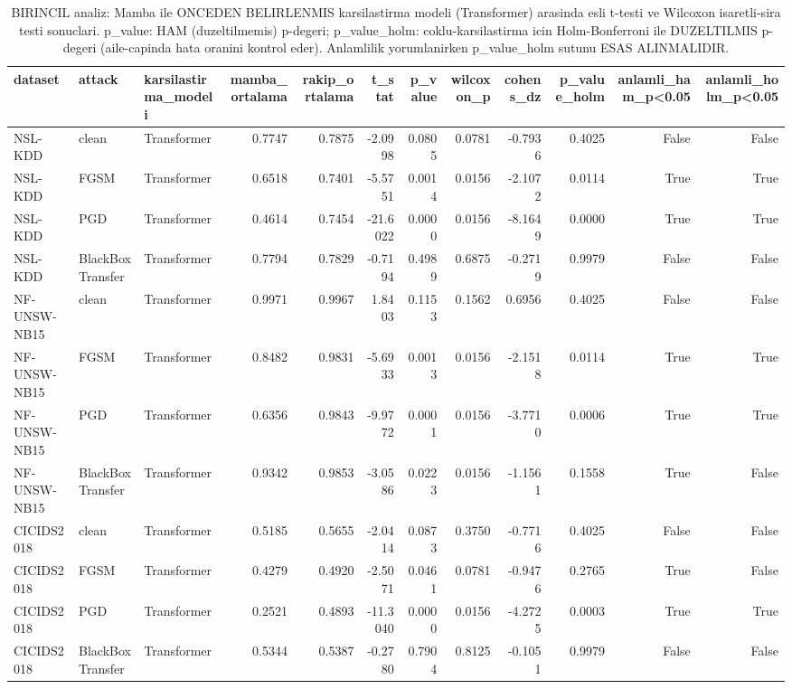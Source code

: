 \begin{table}[ht]
\centering
\caption{BIRINCIL analiz: Mamba ile ONCEDEN BELIRLENMIS karsilastirma modeli (Transformer) arasinda esli t-testi ve Wilcoxon isaretli-sira testi sonuclari. p_value: HAM (duzeltilmemis) p-degeri; p_value_holm: coklu-karsilastirma icin Holm-Bonferroni ile DUZELTILMIS p-degeri (aile-capinda hata oranini kontrol eder). Anlamlilik yorumlanirken p_value_holm sutunu ESAS ALINMALIDIR.}
\label{tab:T2_istatistiksel_anlamlilik}
\begin{tabular}{lllrrrrrrrrr}
\toprule
dataset & attack & karsilastirma\_modeli & mamba\_ortalama & rakip\_ortalama & t\_stat & p\_value & wilcoxon\_p & cohens\_dz & p\_value\_holm & anlamli\_ham\_p<0.05 & anlamli\_holm\_p<0.05 \\
\midrule
NSL-KDD & clean & Transformer & 0.7747 & 0.7875 & -2.0998 & 0.0805 & 0.0781 & -0.7936 & 0.4025 & False & False \\
NSL-KDD & FGSM & Transformer & 0.6518 & 0.7401 & -5.5751 & 0.0014 & 0.0156 & -2.1072 & 0.0114 & True & True \\
NSL-KDD & PGD & Transformer & 0.4614 & 0.7454 & -21.6022 & 0.0000 & 0.0156 & -8.1649 & 0.0000 & True & True \\
NSL-KDD & BlackBoxTransfer & Transformer & 0.7794 & 0.7829 & -0.7194 & 0.4989 & 0.6875 & -0.2719 & 0.9979 & False & False \\
NF-UNSW-NB15 & clean & Transformer & 0.9971 & 0.9967 & 1.8403 & 0.1153 & 0.1562 & 0.6956 & 0.4025 & False & False \\
NF-UNSW-NB15 & FGSM & Transformer & 0.8482 & 0.9831 & -5.6933 & 0.0013 & 0.0156 & -2.1518 & 0.0114 & True & True \\
NF-UNSW-NB15 & PGD & Transformer & 0.6356 & 0.9843 & -9.9772 & 0.0001 & 0.0156 & -3.7710 & 0.0006 & True & True \\
NF-UNSW-NB15 & BlackBoxTransfer & Transformer & 0.9342 & 0.9853 & -3.0586 & 0.0223 & 0.0156 & -1.1561 & 0.1558 & True & False \\
CICIDS2018 & clean & Transformer & 0.5185 & 0.5655 & -2.0414 & 0.0873 & 0.3750 & -0.7716 & 0.4025 & False & False \\
CICIDS2018 & FGSM & Transformer & 0.4279 & 0.4920 & -2.5071 & 0.0461 & 0.0781 & -0.9476 & 0.2765 & True & False \\
CICIDS2018 & PGD & Transformer & 0.2521 & 0.4893 & -11.3040 & 0.0000 & 0.0156 & -4.2725 & 0.0003 & True & True \\
CICIDS2018 & BlackBoxTransfer & Transformer & 0.5344 & 0.5387 & -0.2780 & 0.7904 & 0.8125 & -0.1051 & 0.9979 & False & False \\
\bottomrule
\end{tabular}

\end{table}
